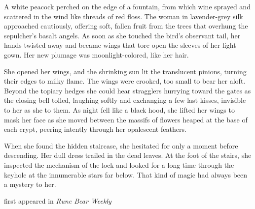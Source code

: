 A white peacock perched on the edge of a fountain, from which wine
sprayed and scattered in the wind like threads of red floss. The woman
in lavender-grey silk approached cautiously, offering soft, fallen fruit
from the trees that overhung the sepulcher's basalt angels. As soon as
she touched the bird's observant tail, her hands twisted away and became
wings that tore open the sleeves of her light gown. Her new plumage was
moonlight-colored, like her hair.

She opened her wings, and the shrinking sun lit the translucent pinions,
turning their edges to milky flame. The wings were crooked, too small to
bear her aloft. Beyond the topiary hedges she could hear stragglers
hurrying toward the gates as the closing bell tolled, laughing softly
and exchanging a few last kisses, invisible to her as she to them. As
night fell like a black hood, she lifted her wings to mask her face as
she moved between the massifs of flowers heaped at the base of each
crypt, peering intently through her opalescent feathers.

When she found the hidden staircase, she hesitated for only a moment
before descending. Her dull dress trailed in the dead leaves. At the
foot of the stairs, she inspected the mechanism of the lock and looked
for a long time through the keyhole at the innumerable stars far below.
That kind of magic had always been a mystery to her.

first appeared in \emph{Rune Bear Weekly}
